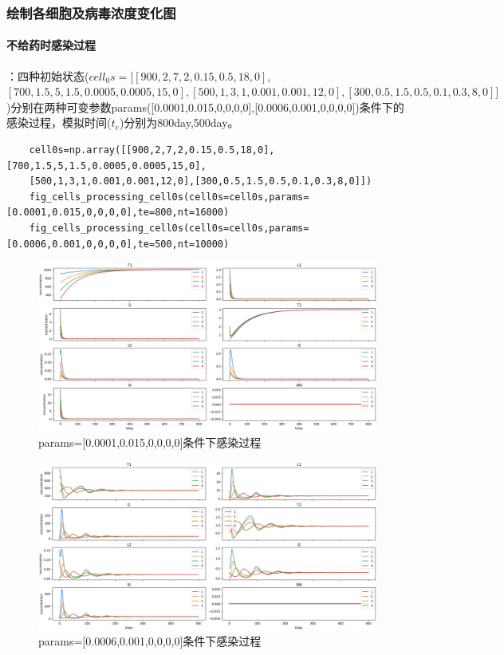 \documentclass{ctexart}
\begin{document}
\subsubsection{绘制各细胞及病毒浓度变化图}
\paragraph{不给药时感染过程}：四种初始状态($cell_{0}s=[[900,2,7,2,0.15,0.5,18,0],$\\$[700,1.5,5,1.5,0.0005,0.0005,15,0],[500,1,3,1,0.001,0.001,12,0],[300,0.5,1.5,0.5,0.1,0.3,8,0]]$)分别在两种可变参数params([0.0001,0.015,0,0,0,0],[0.0006,0.001,0,0,0,0])条件下的感染过程，模拟时间($t_{e}$)分别为800day,500day。
    \begin{lstlisting}
    cell0s=np.array([[900,2,7,2,0.15,0.5,18,0],[700,1.5,5,1.5,0.0005,0.0005,15,0],
    [500,1,3,1,0.001,0.001,12,0],[300,0.5,1.5,0.5,0.1,0.3,8,0]])
    fig_cells_processing_cell0s(cell0s=cell0s,params=[0.0001,0.015,0,0,0,0],te=800,nt=16000)
    fig_cells_processing_cell0s(cell0s=cell0s,params=[0.0006,0.001,0,0,0,0],te=500,nt=10000)
\end{lstlisting}
    \begin{figure}[H]
        \centering
        \includegraphics[width=\linewidth]{1.1.png}
        \caption{params=[0.0001,0.015,0,0,0,0]条件下感染过程}
        \label{fig.1.1}
    \end{figure}
    \begin{figure}[H]
        \centering
        \includegraphics[width=0.95\linewidth]{1.2.png}
        \caption{params=[0.0006,0.001,0,0,0,0]条件下感染过程}
        \label{fig.1.2}
    \end{figure}
\end{document}
